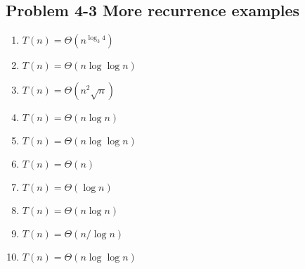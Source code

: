 \subsection*{Problem 4-3 More recurrence examples}
\begin{enumerate}
	\item	$T(n)=\Theta(n^{\log_3{4}})$
	\item	$T(n)=\Theta(n\log \log n)$
	\item	$T(n)=\Theta(n^2 \sqrt{n})$
	\item	$T(n)=\Theta(n \log n)$
	\item	$T(n)=\Theta(n \log \log n)$
	\item	$T(n)=\Theta(n)$
	\item	$T(n)=\Theta(\log n)$
	\item	$T(n)=\Theta(n \log n)$
	\item	$T(n)=\Theta(n/ \log n)$
	\item	$T(n)=\Theta(n \log \log n)$
\end{enumerate}

